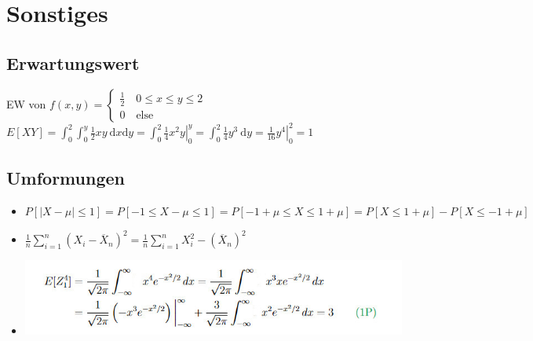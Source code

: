 
\section{Sonstiges}
\subsection{Erwartungswert}
\begin{itemize}
     EW von $f(x,y) =
        \begin{cases}
            \frac{1}{2} \quad 0 \le x \le y \le 2\\
            0 \quad \text{else}
        \end{cases}$
        $E[XY] = \int_0^2 \int_0^y \frac{1}{2} x y \ \mathrm{d}x \mathrm{d}y = \int_0^2 \left. \frac{1}{4} x^2 y \right|_0^y = \int_0^2 \frac{1}{4} y^3 \ \mathrm{d}y = \left. \frac{1}{16} y^4 \right|_0^2 = 1$
\end{itemize}

\subsection{Umformungen}
\begin{itemize}
    \item $P[|X - \mu| \le 1] = P[-1 \le X - \mu \le 1] = P[-1 + \mu \le X \le 1 + \mu] = P[X \le 1 + \mu] - P[X \le -1 + \mu]$
    \item $\frac{1}{n} \sum_{i=1}^{n} (X_i - \overline X_n)^2 = \frac{1}{n} \sum_{i=1}^n X_i^2 - (\overline X_n)^2$
    \item \includegraphics[width=\linewidth]{./Figures/Umformung.jpg}
\end{itemize}

